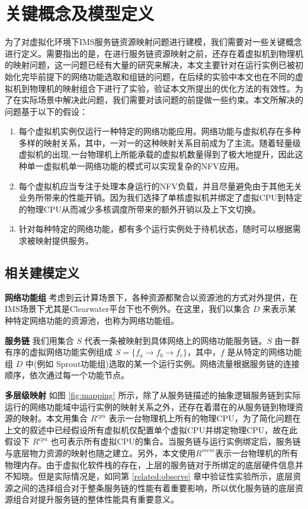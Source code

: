 \section{关键概念及模型定义}
为了对虚拟化环境下IMS服务链资源映射问题进行建模，我们需要对一些关键概念进行定义。需要指出的是，在进行服务链资源映射之前，还存在着虚拟机到物理机的映射问题，这一问题已经有大量的研究来解决，本文主要针对在运行实例已被初始化完毕前提下的网络功能选取和组链的问题，在后续的实验中本文也在不同的虚拟机到物理机的映射组合下进行了实验，验证本文所提出的优化方法的有效性。为了在实际场景中解决此问题，我们需要对该问题的前提做一些约束。本文所解决的问题基于以下的假设：
\begin{enumerate}
	\item 每个虚拟机实例仅运行一种特定的网络功能应用。网络功能与虚拟机存在多种多样的映射关系，其中，一对一的这种映射关系目前成为了主流。随着轻量级虚拟机的出现,一台物理机上所能承载的虚拟机数量得到了极大地提升，因此这种单一虚拟机单一网络功能的模式可以实现复杂的NFV应用。
	\item 每个虚拟机应当专注于处理本身运行的NFV负载，并且尽量避免由于其他无关业务所带来的性能开销。因为我们选择了单核虚拟机并绑定了虚拟CPU到特定的物理CPU从而减少多核调度所带来的额外开销以及上下文切换。
	\item 针对每种特定的网络功能，都有多个运行实例处于待机状态，随时可以根据需求被映射提供服务。
\end{enumerate}
\subsection{相关建模定义}
\textbf{网络功能组}{ }考虑到云计算场景下，各种资源都聚合以资源池的方式对外提供，在IMS场景下尤其是Clearwater平台下也不例外。在这里，我们以集合 $D$ 来表示某种特定网络功能的资源池，也称为网络功能组。

\textbf{服务链}{ }我们用集合 $S$ 代表一条被映射到具体网络上的网络功能服务链。$S$ 由一群有序的虚拟网络功能实例组成 $S = \{f_{a} \to f_{b} \to f_{c}\}$，其中，$f$ 是从特定的网络功能组 $D$ 中(例如 Sprout功能组)选取的某一个运行实例。网络流量根据服务链的连接顺序，依次通过每一个功能节点。

\textbf{多层级映射}{ }如图 \ref{fig:mapping} 所示，除了从服务链描述的抽象逻辑服务链到实际运行的网络功能域中运行实例的映射关系之外，还存在着潜在的从服务链到物理资源的映射。本文用集合 $R^{cpu}$ 表示一台物理机上所有的物理CPU，为了简化问题在上文的叙述中已经假设所有虚拟机仅配置单个虚拟CPU并绑定物理CPU，故在此假设下 $R^{cpu}$ 也可表示所有虚拟CPU的集合。当服务链与运行实例绑定后，服务链与底层物力资源的映射也随之建立。另外，本文使用$R^{mem}$表示一台物理机的所有物理内存。由于虚拟化软件栈的存在，上层的服务链对于所绑定的底层硬件信息并不知晓。但是实际情况是，如同第 \ref{related:observe} 章中验证性实验所示，底层资源之间的选择组合对于整条服务链的性能有着重要影响，所以优化服务链的底层资源组合对提升服务链的整体性能具有重要意义。

